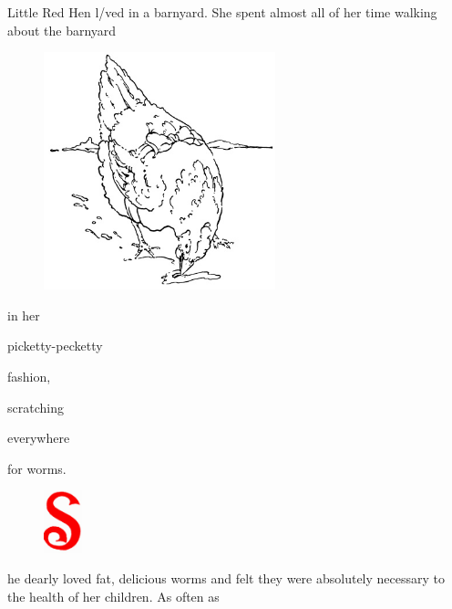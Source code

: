 \documentclass[letterpaper, 10pt, openany]{memoir}
\begin{document}
Little Red Hen l/ved in a barnyard. She spent almost all of her time walking about the 
barnyard 

\vspace{\onelineskip}

\begin{figure}
	\includegraphics[width=0.6\textwidth]{image_005_2.jpg}
\end{figure}

in her

\vspace{\onelineskip}

picketty-pecketty

\vspace{\onelineskip}

fashion,

\vspace{\onelineskip}

scratching

\vspace{\onelineskip}

everywhere

\vspace{\onelineskip}

for worms.

\newpage
\begin{figure}
	\includegraphics[width=0.1\textwidth]{image_012_1.jpg}
\end{figure}

he dearly loved fat, delicious worms and felt they were absolutely necessary to the
health of her children. As often as
\end{document}
